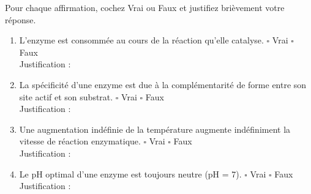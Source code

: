 \documentclass[11pt]{article}
\begin{document}
\begin{exercice}
Pour chaque affirmation, cochez Vrai ou Faux et justifiez brièvement votre réponse.
\begin{enumerate}
    \item L'enzyme est consommée au cours de la réaction qu'elle catalyse. \hfill $\square$ Vrai \quad $\square$ Faux \\
    Justification : \dotfill
    \item La spécificité d'une enzyme est due à la complémentarité de forme entre son site actif et son substrat. \hfill $\square$ Vrai \quad $\square$ Faux \\
    Justification : \dotfill
    \item Une augmentation indéfinie de la température augmente indéfiniment la vitesse de réaction enzymatique. \hfill $\square$ Vrai \quad $\square$ Faux \\
    Justification : \dotfill
    \item Le pH optimal d'une enzyme est toujours neutre (pH = 7). \hfill $\square$ Vrai \quad $\square$ Faux \\
    Justification : \dotfill
\end{enumerate}
\end{exercice}
\end{document}

